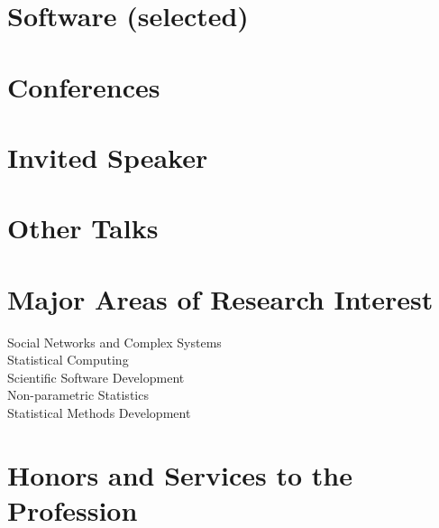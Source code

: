 \documentclass[letterpaper, 12pt]{article}
\begin{document}
\printbibliography[title=\vskip-20pt,keyword=wip,resetnumbers=1]

\section*{Software {\small(selected)}}


\begin{enumerate}[label={[}\arabic*{]},labelindent=5\parindent,labelsep=8pt]

\end{enumerate}


\section*{Conferences}

\printbibliography[title=\vskip-20pt,keyword=conferencetalk, resetnumbers=true]


\section*{Invited Speaker}

\printbibliography[title=\vskip-20pt,keyword=invitedtalk, resetnumbers=true]

\section*{Other Talks}

\printbibliography[title=\vskip-20pt,keyword=othertalk, resetnumbers=true]

\section*{Major Areas of Research Interest}

Social Networks and Complex Systems\\
Statistical Computing\\
Scientific Software Development \\
Non-parametric Statistics\\
Statistical Methods Development

\section*{Honors and Services to the Profession}
\end{document}
